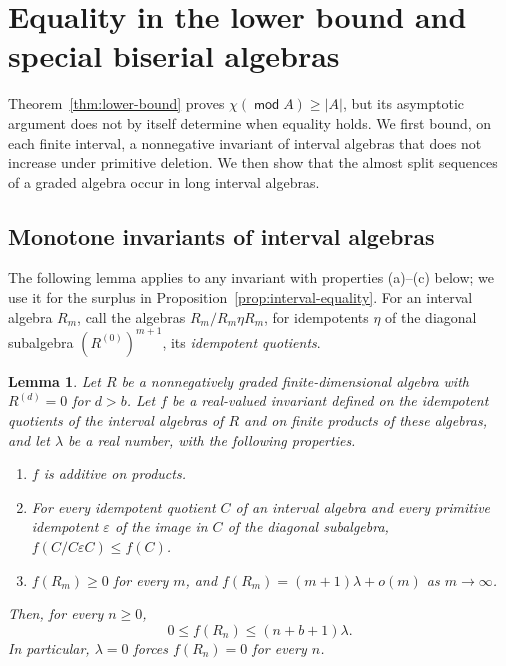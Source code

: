 \documentclass[a4paper,reqno,10pt]{amsart}
\newtheorem{lemma}[theorem]{Lemma}
\theoremstyle{definition}
\numberwithin{equation}{section}
\DeclareMathOperator{\moduleCategory}{\mathsf{mod}}
\renewcommand{\mod}{\moduleCategory}
\begin{document}
\section{Equality in the lower bound and special biserial algebras}\label{sec:equality}
Theorem~\ref{thm:lower-bound} proves \(\chi(\mod A)\geq|A|\), but its
asymptotic argument does not by itself determine when equality holds. We first bound, on each finite interval, a nonnegative invariant of
interval algebras that does not increase under primitive deletion. We then
show that the almost split sequences of a graded algebra occur in long
interval algebras.

\subsection{Monotone invariants of interval algebras}\label{subsec:interval-equality}
The following lemma applies to any invariant with properties (a)--(c)
below; we use it for the
surplus in Proposition~\ref{prop:interval-equality}. For an interval
algebra \(R_m\), call the algebras \(R_m/R_m\eta R_m\), for
idempotents \(\eta\) of the diagonal subalgebra
\((R^{(0)})^{m+1}\), its \emph{idempotent quotients}.
\begin{lemma}\label{lem:separated-intervals}
Let \(R\) be a nonnegatively graded finite-dimensional algebra with
\(R^{(d)}=0\) for \(d>b\). Let \(f\) be a real-valued invariant defined
on the idempotent quotients of the interval algebras of \(R\) and on
finite products of these algebras, and let \(\lambda\) be a real number,
with the following properties.
\begin{enumerate}[label={\upshape(\alph*)}]
\item \(f\) is additive on products.
\item For every idempotent quotient \(C\) of an interval algebra and every
primitive idempotent \(\varepsilon\) of the image in \(C\) of the diagonal
subalgebra, \(f(C/C\varepsilon C)\leq f(C)\).
\item \(f(R_m)\geq0\) for every \(m\), and
\(f(R_m)=(m+1)\lambda+o(m)\) as \(m\to\infty\).
\end{enumerate}
Then, for every \(n\geq0\),
\[
 0\leq f(R_n)\leq(n+b+1)\lambda.
\]
In particular, \(\lambda=0\) forces \(f(R_n)=0\) for every \(n\).
\end{lemma}
\end{document}
